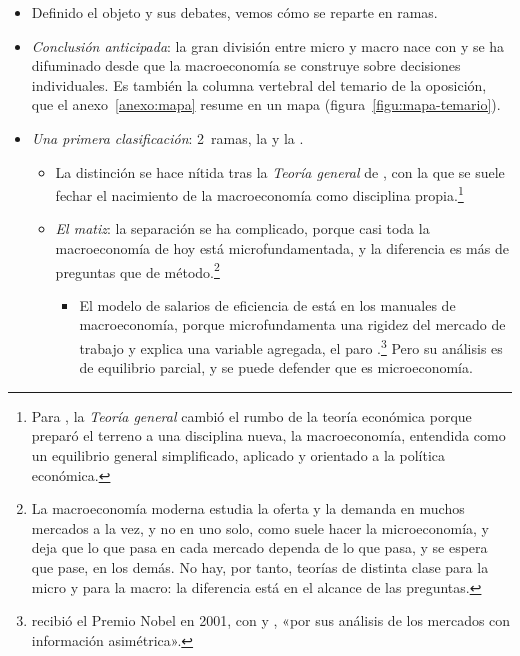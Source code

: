 \documentclass[11pt]{article}
\begin{document}
\begin{itemize}
\item Definido el objeto y sus debates, vemos cómo se reparte en ramas.
\item \emph{Conclusión anticipada}: la gran división entre micro y macro nace con  y se ha difuminado desde que la macroeconomía se construye sobre decisiones individuales. Es también la columna vertebral del temario de la oposición, que el anexo~\ref{anexo:mapa} resume en un mapa (figura~\ref{figu:mapa-temario}).
\item \emph{Una primera clasificación}: 2~ramas, la  y la .
  \begin{itemize}
  \item La distinción se hace nítida tras la \emph{Teoría general} de \textcite{Keynes1936}, con la que se suele fechar el nacimiento de la macroeconomía como disciplina propia.\footnote{Para \textcite{DeVroey2016History}, la \emph{Teoría general} cambió el rumbo de la teoría económica porque preparó el terreno a una disciplina nueva, la macroeconomía, entendida como un equilibrio general simplificado, aplicado y orientado a la política económica.}
  \item \emph{El matiz}: la separación se ha complicado, porque casi toda la macroeconomía de hoy está microfundamentada, y la diferencia es más de preguntas que de método.\footnote{La macroeconomía moderna estudia la oferta y la demanda en muchos mercados a la vez, y no en uno solo, como suele hacer la microeconomía, y deja que lo que pasa en cada mercado dependa de lo que pasa, y se espera que pase, en los demás. No hay, por tanto, teorías de distinta clase para la micro y para la macro: la diferencia está en el alcance de las preguntas.}
    \begin{itemize}
    \item El modelo de salarios de eficiencia de \textcite{ShapiroStiglitz1984Equilibrium} está en los manuales de macroeconomía, porque microfundamenta una rigidez del mercado de trabajo y explica una variable agregada, el paro .\footnote{ recibió el Premio Nobel en 2001, con  y , «por sus análisis de los mercados con información asimétrica»\nocite{Nobel2001AkerlofSpenceStiglitz}.} Pero su análisis es de equilibrio parcial, y se puede defender que es microeconomía.
    \end{itemize}
  \end{itemize}
\end{itemize}
\end{document}
